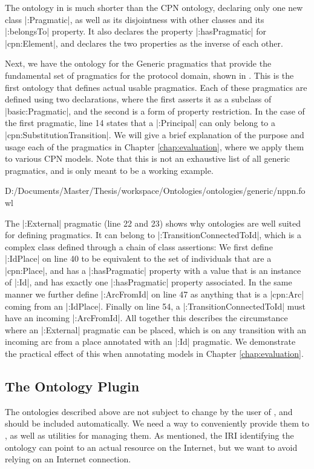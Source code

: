 The ontology in  is much shorter than the CPN ontology,
declaring only one new class |:Pragmatic|, as well as its disjointness with
other classes and its |:belongsTo| property. It also declares the property
|:hasPragmatic| for |cpn:Element|, and declares the two properties as the
inverse of each other.

Next, we have the ontology for the Generic pragmatics that provide the
fundamental set of pragmatics for the protocol domain, shown in
. This is the first ontology that defines actual usable
pragmatics. Each of these pragmatics are defined using two declarations, where
the first asserts it as a subclass of |basic:Pragmatic|, and the second is a
form of property restriction. In the case of the first pragmatic, line 14 states
that a |:Principal| can only belong to a |cpn:SubstitutionTransition|. We will
give a brief explanation of the purpose and usage each of the pragmatics in
Chapter \ref{chap:evaluation}, where we apply them to various CPN models. Note
that this is not an exhaustive list of all generic pragmatics, and is only meant
to be a working example.


{D:/Documents/Master/Thesis/workspace/Ontologies/ontologies/generic/nppn.fowl}

The |:External| pragmatic (line 22 and 23) shows why ontologies are well suited
for defining pragmatics. It can belong to |:TransitionConnectedToId|, which is a
complex class defined through a chain of class assertions: We first define
|:IdPlace| on line 40 to be equivalent to the set of individuals that are a |cpn:Place|, and
has a |:hasPragmatic| property with a value that is an instance of |:Id|, and
has exactly one |:hasPragmatic| property associated. In the same manner we
further define |:ArcFromId| on line 47 as anything that is a |cpn:Arc| coming
from an |:IdPlace|. Finally on line 54, a |:TransitionConnectedToId| must have
an incoming |:ArcFromId|. All together this describes the circumstance where an
|:External| pragmatic can be placed, which is on any transition with an incoming
arc from a place annotated with an |:Id| pragmatic. We demonstrate the practical
effect of this when annotating models in Chapter \ref{chap:evaluation}.

\subsection{The Ontology Plugin}\label{sec:ontologiesPlugin}
The ontologies described above are not subject to change by the user of
\thename{}, and should be included automatically. We need a
way to conveniently provide them to \thename{}, as well as utilities for managing
them. As mentioned, the IRI identifying the ontology can point to an actual
resource on the Internet, but we want to avoid relying on an Internet
connection. 

